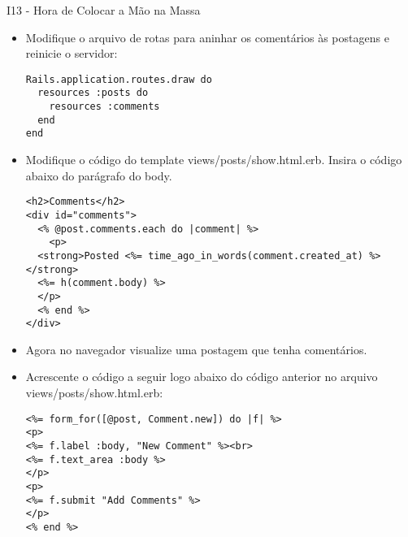 \begin{frame}{I13 - Hora de Colocar a Mão na Massa}
	\begin{itemize}
		\item Modifique o arquivo de rotas para aninhar os comentários às postagens e reinicie o servidor:
		\begin{lstlisting}[style=RubyInputStyle, caption=config/routes.rb]
Rails.application.routes.draw do
  resources :posts do 
    resources :comments
  end 
end 
		\end{lstlisting}

%		
		
%				
				
		\item Modifique o código do template \alert{views/posts/show.html.erb}. Insira o código abaixo do parágrafo do body.
		\begin{lstlisting}[style=RubyInputStyle]
<h2>Comments</h2>
<div id="comments">
  <% @post.comments.each do |comment| %>
	<p>
  <strong>Posted <%= time_ago_in_words(comment.created_at) %></strong>
  <%= h(comment.body) %>
  </p>
  <% end %>
</div>
		\end{lstlisting}

	\item Agora no navegador visualize uma postagem que tenha comentários.
	\item Acrescente o código a seguir logo abaixo do código anterior no arquivo \alert{views/posts/show.html.erb}:
	\begin{lstlisting}[style=RubyInputStyle]
<%= form_for([@post, Comment.new]) do |f| %>
<p>
<%= f.label :body, "New Comment" %><br>
<%= f.text_area :body %>
</p>
<p>
<%= f.submit "Add Comments" %>
</p>
<% end %>
\end{lstlisting}


\end{itemize}
\end{frame}
